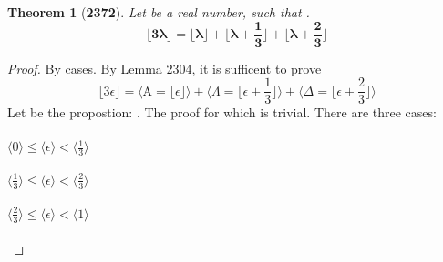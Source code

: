 \documentclass[preview]{standalone}
\newtheorem{theorem}{Theorem}
\begin{document}
\begin{theorem}[\textbf{2372}]
    Let \bm{$\lambda$} be a real number, such that
    \bm{$\big \lfloor \lambda \big \rfloor + \epsilon = \lambda$}.
    \begin{equation*}
        \bm{
            \bigg \lfloor 3 \lambda \bigg \rfloor
                = 
            \bigg \lfloor \lambda \bigg \rfloor
                + 
            \bigg \lfloor \lambda + \frac{1}{3} \bigg \rfloor
                + 
            \bigg \lfloor \lambda + \frac{2}{3} \bigg \rfloor
        }
    \end{equation*}
\end{theorem}

\begin{proof}
    By cases. By Lemma 2304, it is sufficent to prove
    \begin{equation*}
        \bigg \lfloor 3 \epsilon \bigg \rfloor
            =
        \Bigg \langle 
            \mathrm{A} 
                = 
            \bigg \lfloor \epsilon \bigg \rfloor 
        \Bigg \rangle
            +
        \Bigg \langle
            \Lambda
                = 
            \bigg \lfloor \epsilon + \frac{1}{3} \bigg \rfloor 
        \Bigg \rangle
            +
        \Bigg \langle
            \Delta
                = 
            \bigg \lfloor \epsilon + \frac{2}{3} \bigg \rfloor
        \Bigg \rangle
    \end{equation*}
    Let  be the propostion: .
    The proof for which is trivial.
    There are three cases:
    \\ \\
    \indent \indent {} \space \space
    $
        \Big \langle 0 \Big \rangle 
            \le 
        \Big \langle \epsilon \Big \rangle
            < 
        \Big \langle \frac{1}{3} \Big \rangle
    $
    \\ \\
    \indent \indent {} \space
    $
        \Big \langle \frac{1}{3} \Big \rangle 
            \le 
        \Big \langle \epsilon \Big \rangle
            < 
        \Big \langle \frac{2}{3} \Big \rangle
    $ 
    \\ \\
    \indent \indent {}
    $ 
        \Big \langle \frac{2}{3} \Big \rangle 
            \le 
        \Big \langle \epsilon \Big \rangle 
            < 
        \Big \langle 1 \Big \rangle
    $
    \\ \\

\end{proof}
\end{document}
